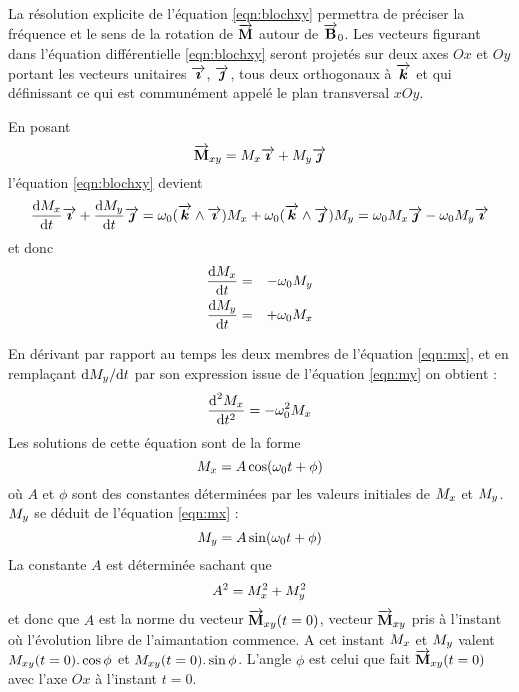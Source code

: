 La résolution explicite de l'équation \ref{eqn:blochxy} permettra de préciser la
fréquence et le sens de la rotation de $\overrightarrow{\mathbf{M}}$
autour de $\overrightarrow{\mathbf{B}}_0$.
Les vecteurs figurant dans l'équation différentielle \ref{eqn:blochxy}
seront projetés sur deux axes $Ox$ et $Oy$
portant les vecteurs unitaires $\overrightarrow{\boldsymbol{\imath}}$,
$\overrightarrow{\boldsymbol{\jmath}}$, tous deux orthogonaux à $\overrightarrow{\boldsymbol{k}}$
et qui définissant ce qui est communément appelé le plan transversal $xOy$.

En posant
\begin{equation}
\overrightarrow{\mathbf{M}}_{xy} = M_x \overrightarrow{\boldsymbol{\imath}} + M_y \overrightarrow{\boldsymbol{\jmath}}
\end{equation}
l'équation \ref{eqn:blochxy} devient
\begin{equation}
\frac{\mbox{d}M_x}{\mbox{d} t} \overrightarrow{\boldsymbol{\imath}} + \frac{\mbox{d}M_y}{\mbox{d} t} \overrightarrow{\boldsymbol{\jmath}} =
\omega_0 (\overrightarrow{\boldsymbol{k}} \wedge \overrightarrow{\boldsymbol{\imath}})M_x +
\omega_0 (\overrightarrow{\boldsymbol{k}} \wedge \overrightarrow{\boldsymbol{\jmath}})M_y =
\omega_0 M_x \overrightarrow{\boldsymbol{\jmath}} -
\omega_0 M_y \overrightarrow{\boldsymbol{\imath}}
\end{equation}
et donc
\begin{eqnarray}
\label{eqn:mx}
\frac{\mbox{d}M_x}{\mbox{d} t} & = & -\omega_0 M_y \\
\label{eqn:my}
\frac{\mbox{d}M_y}{\mbox{d} t} & = & +\omega_0 M_x
\end{eqnarray}

En dérivant par rapport au temps les deux membres de l'équation \ref{eqn:mx},
et en remplaçant $\mbox{d}M_y/\mbox{d}t$ par son expression issue de
l'équation \ref{eqn:my} on obtient :
\begin{equation}
\frac{\mbox{d}^2M_x}{\mbox{d} t^2} = -\omega_0^2 M_x
\end{equation}
Les solutions de cette équation sont de la forme
\begin{equation}
\label{eqn:mxlarmor}
M_x = A\cos(\omega_0 t + \phi)
\end{equation}
où $A$ et $\phi$ sont des constantes déterminées par les valeurs initiales de
$M_x$ et $M_y$.
$M_y$ se déduit de l'équation \ref{eqn:mx} :
\begin{equation}
\label{eqn:mylarmor}
M_y = A\sin(\omega_0 t + \phi)
\end{equation}
La constante $A$ est déterminée sachant que
\begin{equation}
A^2 = M_x^2 + M_y^2
\end{equation}
et donc que $A$ est la norme du vecteur $\overrightarrow{\mathbf{M}}_{xy}(t=0)$,
vecteur $\overrightarrow{\mathbf{M}}_{xy}$ pris à l'instant où
l'évolution libre de l'aimantation commence.
A cet instant $M_x$ et $M_y$ valent
$M_{xy}(t=0).\cos\phi$ et
$M_{xy}(t=0).\sin\phi$.
L'angle $\phi$ est celui que fait
$\overrightarrow{\mathbf{M}}_{xy}(t=0)$ avec l'axe $Ox$ à l'instant $t = 0$.

